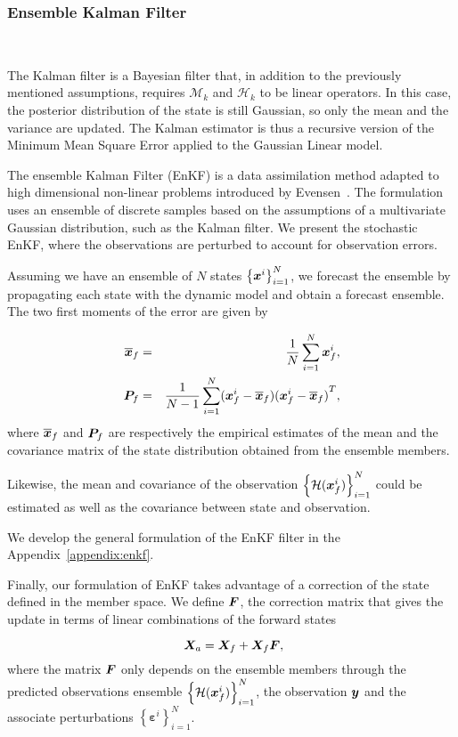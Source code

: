 \subsubsection{Ensemble Kalman Filter}~{\label{enkf}}

The Kalman filter \cite{kalman_new_1960} is a Bayesian filter that, in addition to the previously mentioned assumptions, requires $\mathcal{M}_k$ and $\mathcal{H}_k$ to be linear operators. In this case, the posterior distribution of the state is still Gaussian, so only the mean and the variance are updated. The Kalman estimator is thus a recursive version of the Minimum Mean Square Error applied to the Gaussian Linear model.

The ensemble Kalman Filter (EnKF) is a data assimilation method adapted to high dimensional non-linear problems introduced by Evensen~\cite{evensen_sequential_1994}. The formulation uses an ensemble of discrete samples based on the assumptions of a multivariate Gaussian distribution, such as the Kalman filter. We present the stochastic EnKF, where the observations are perturbed to account for observation errors.

Assuming we have an ensemble of $N$ states $\left\{\bm {\bm{x}}^i \right\}_{i=1}^N$, we forecast the ensemble by propagating each state with the dynamic model and obtain a forecast ensemble.
The two first moments of the error are given by

\begin{eqnarray*}
    \overline{\bm{x}}_f &=& \frac{1}{N} \sum_{i = 1}^{N} \bm{x}^i_f, \\
    \bm{P}_f &=& \frac{1}{N-1} \sum_{i = 1}^{N} (\bm{x}^i_f - \overline{\bm{x}}_f){(\bm{x}^i_f - \overline{\bm{x}}_f)}^T,
\end{eqnarray*}
where $\overline{\bm{x}}_f$ and $\bm{P}_f$ are respectively the empirical estimates of the mean and  the covariance matrix of the state distribution obtained from the ensemble members.

Likewise, the mean and covariance of the observation $\left\{\mathcal{H}(\bm{x}^i_f) \right\}_{i=1}^N$ could be estimated as well as the covariance between state and observation.

We develop the general formulation of the EnKF filter in the Appendix~\ref{appendix:enkf}.

Finally, our formulation of EnKF takes advantage of a correction of the state defined in the member space. We define $\bm{F}$, the correction matrix that gives the update in terms of linear combinations of the forward states

\begin{equation}~\label{enkf_formula_Fcorr}
    \bm{X}_a = \bm{X}_f + \bm{X}_f \bm{F},
\end{equation}where the matrix $\bm{F}$ only depends on the ensemble members through the predicted observations ensemble $\left\{\mathcal{H}(\bm{x}^i_f) \right\}^N_{i=1}$, the observation $\bm{y}$ and the associate perturbations  $\left\{\bm{\varepsilon}^i \right\}^N_{i=1}$.